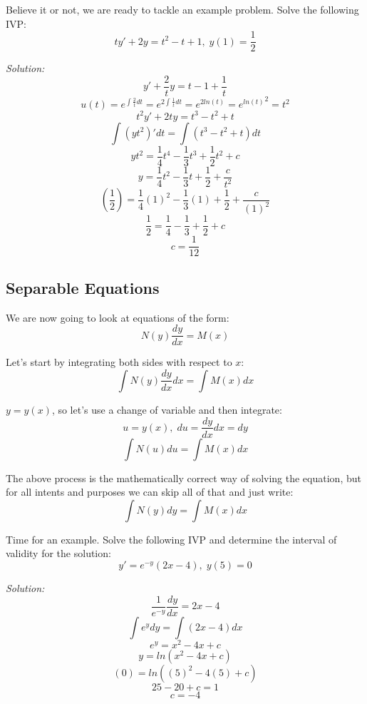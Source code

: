 Believe it or not, we are ready to tackle an example problem. Solve the following IVP:
$$ty' + 2y = t^2 - t + 1,\; y(1) = \frac{1}{2}$$

\textit{Solution:}
$$y' + \frac{2}{t}y = t - 1 + \frac{1}{t}$$
$$u(t) = e^{\int \frac{2}{t}dt} = e^{2\int \frac{1}{t}dt} = e^{2ln(t)} = {e^{ln(t)}}^2 = t^{2}$$
$$t^{2}y' + 2ty = t^{3} - t^{2} + t$$
$$\int (yt^{2})'dt = \int (t^{3} - t^{2} + t)dt$$
$$yt^{2} = \frac{1}{4}t^{4} - \frac{1}{3}t^{3} + \frac{1}{2}t^{2} + c$$
$$y = \frac{1}{4}t^{2} - \frac{1}{3}t + \frac{1}{2} + \frac{c}{t^{2}}$$
$$\left(\frac{1}{2}\right) = \frac{1}{4}(1)^{2} - \frac{1}{3}(1) + \frac{1}{2} + \frac{c}{(1)^{2}}$$
$$\frac{1}{2} = \frac{1}{4} - \frac{1}{3} + \frac{1}{2} + c$$
$$c = \frac{1}{12}$$
\begin{center}
\end{center}

\pagebreak

\subsection{Separable Equations}
We are now going to look at equations of the form:
$$N(y)\frac{dy}{dx} = M(x)$$

Let's start by integrating both sides with respect to $x$:
$$\int N(y)\frac{dy}{dx}dx = \int M(x)dx$$

$y = y(x)$, so let's use a change of variable and then integrate:
$$u = y(x),\; du = \frac{dy}{dx}dx = dy$$
$$\int N(u)du = \int M(x)dx$$

The above process is the mathematically correct way of solving the equation, but for all intents and purposes we can skip all of that and just write:
$$\int N(y)dy = \int M(x)dx$$

Time for an example. Solve the following IVP and determine the interval of validity for the solution:
$$y' = e^{-y}(2x - 4),\; y(5) = 0$$

\textit{Solution:}
$$\frac{1}{e^{-y}}\frac{dy}{dx} = 2x - 4$$
$$\int e^{y}dy = \int (2x - 4)dx$$
$$e^{y} = x^{2} - 4x + c$$
$$y = ln(x^{2} - 4x + c)$$
$$(0) = ln((5)^{2} - 4(5) + c)$$
$$25 - 20 + c = 1$$
$$c = -4$$
\begin{center}
\end{center}

\pagebreak

